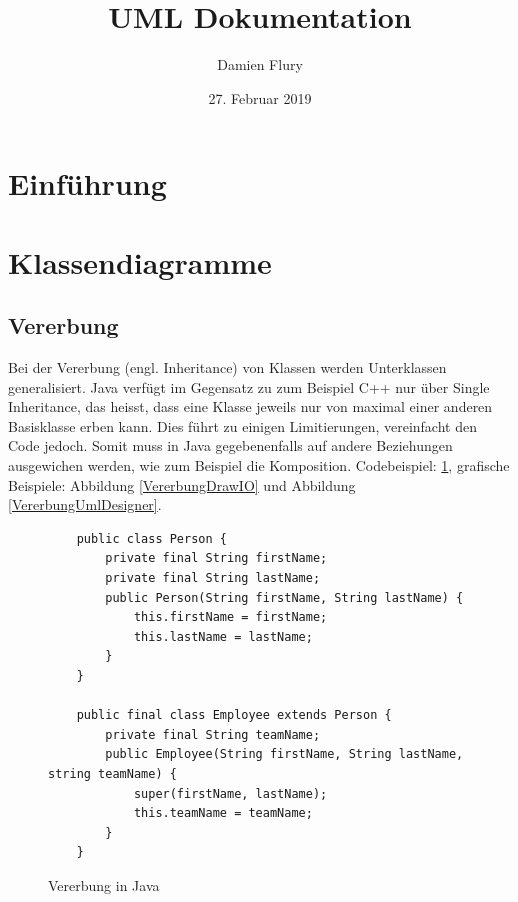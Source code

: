 \documentclass[a4paper, titlepage]{scrartcl}
\title{UML Dokumentation}
\author{Damien Flury}
\date{27. Februar 2019}
\begin{document}
    \maketitle
    \tableofcontents
    \newpage
    \section{Einführung}
    \section{Klassendiagramme}
    \subsection{Vererbung}
    Bei der Vererbung (engl. Inheritance) von Klassen werden Unterklassen generalisiert. Java
    verfügt im Gegensatz zu zum Beispiel C++ nur über Single Inheritance, das heisst, dass eine Klasse
    jeweils nur von maximal einer anderen Basisklasse erben kann. Dies führt zu einigen Limitierungen,
    vereinfacht den Code jedoch. Somit muss in Java gegebenenfalls auf andere Beziehungen ausgewichen werden,
    wie zum Beispiel die Komposition. Codebeispiel: \ref{InheritanceJava}, grafische Beispiele: Abbildung \ref{VererbungDrawIO}
    und Abbildung \ref{VererbungUmlDesigner}.

    \begin{figure}
        \begin{lstlisting}
    public class Person {
        private final String firstName;
        private final String lastName;
        public Person(String firstName, String lastName) {
            this.firstName = firstName;
            this.lastName = lastName;
        }        
    }

    public final class Employee extends Person {
        private final String teamName;
        public Employee(String firstName, String lastName, string teamName) {
            super(firstName, lastName);
            this.teamName = teamName;
        }
    }
        \end{lstlisting}
    \caption{Vererbung in Java}
    \label{InheritanceJava}
    \end{figure}
\end{document}
